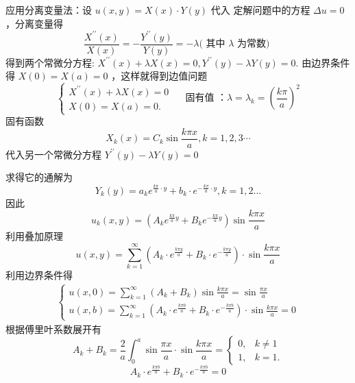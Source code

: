\begin{questions}
\begin{solution}
应用分离变量法：设 $ u(x, y)=X(x) \cdot Y(y) $
代入 定解问题中的方程 $ \Delta u=0 $ ，分离变量得
$$
\frac{X^{\prime \prime}(x)}{X(x)}=-\frac{Y^{\prime \prime}(y)}{Y(y)}=-\lambda(\text { 其中 } \lambda \text { 为常数) }
$$
得到两个常微分方程: $ X^{\prime \prime}(x)+\lambda X(x)=0, Y^{\prime \prime}(y)-\lambda Y(y)=0 $.
由边界条件得 $ X(0)=X(a)=0 $ ，这样就得到边值问题
$$
\left\{\begin{array}{l}
X^{\prime \prime}(x)+\lambda X(x)=0 \\
X(0)=X(a)=0 .
\end{array} \quad \text { 固有值 ：} \lambda=\lambda_{k}=\left(\frac{k \pi}{a}\right)^{2}\right.
$$
固有函数
$$ X_{k}(x)=C_{k} \sin \frac{k \pi x}{a} , k=1,2,3 \cdots $$
代入另一个常微分方程 $ Y^{\prime \prime}(y)-\lambda Y(y)=0 $

求得它的通解为 $$ Y_{k}(y)=a_{k} e^{\frac{k \pi}{a} \cdot y}+b_{k} \cdot e^{-\frac{k \pi}{a} \cdot y}, k=1,2 \ldots $$
因此 
$$u_{k}(x, y)=\left(A_{k} e^{\frac{k \pi}{a} y}+B_{k} e^{-\frac{k \pi}{a} y}\right) \sin \frac{k \pi x}{a} $$
利用叠加原理
$$u(x, y)=\sum\limits_{k=1}^{\infty}\left(A_{k} \cdot e^{\frac{k \pi y}{a}}+B_{k} \cdot e^{-\frac{k \pi y}{a}}\right) \cdot \sin \frac{k \pi x}{a} $$
利用边界条件得
$$
\begin{array}{l}
\left\{\begin{array}{l}
u(x, 0)=\sum\limits_{k=1}^{\infty}\left(A_{k}+B_{k}\right) \sin \frac{k \pi x}{a}=\sin \frac{\pi x}{a} \\
u(x, b)=\sum\limits_{k=1}^{\infty}\left(A_{k} \cdot e^{\frac{k \pi b}{a}}+B_{k} \cdot e^{-\frac{k \pi b}{a}}\right)\cdot \sin \frac{k \pi x}{a}=0
\end{array}\right.
\end{array}
$$
根据傅里叶系数展开有
$$ A_{k}+B_{k}=\frac{2}{a} \int_{0}^{a} \sin \frac{\pi x}{a} \cdot \sin \frac{k \pi x}{a}=\left\{\begin{array}{ll}0 ,& k \neq 1 \\ 1 ,& k=1 .\end{array}\right. $$
$$ A_{k} \cdot e^{\frac{k \pi b}{a}}+B_{k} \cdot e^{-\frac{k \pi b}{a}}=0$$


\end{solution}
\end{questions}
